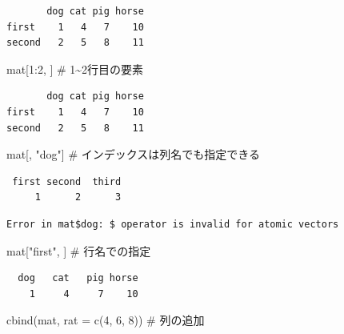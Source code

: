 \documentclass[
  letterpaper,
  DIV=11,
  numbers=noendperiod]{scrreprt}
\newenvironment{Shaded}{\begin{snugshade}}{\end{snugshade}}
\newcommand{\AttributeTok}[1]{\textcolor[rgb]{0.40,0.45,0.13}{#1}}
\newcommand{\CommentTok}[1]{\textcolor[rgb]{0.37,0.37,0.37}{#1}}
\newcommand{\DecValTok}[1]{\textcolor[rgb]{0.68,0.00,0.00}{#1}}
\newcommand{\FunctionTok}[1]{\textcolor[rgb]{0.28,0.35,0.67}{#1}}
\newcommand{\NormalTok}[1]{\textcolor[rgb]{0.00,0.23,0.31}{#1}}
\newcommand{\SpecialCharTok}[1]{\textcolor[rgb]{0.37,0.37,0.37}{#1}}
\newcommand{\StringTok}[1]{\textcolor[rgb]{0.13,0.47,0.30}{#1}}
\begin{document}
\begin{verbatim}
       dog cat pig horse
first    1   4   7    10
second   2   5   8    11
\end{verbatim}

\begin{Shaded}
\begin{Highlighting}[]
\NormalTok{mat[}\DecValTok{1}\SpecialCharTok{:}\DecValTok{2}\NormalTok{, ] }\CommentTok{\# 1\textasciitilde{}2行目の要素}
\end{Highlighting}
\end{Shaded}

\begin{verbatim}
       dog cat pig horse
first    1   4   7    10
second   2   5   8    11
\end{verbatim}

\begin{Shaded}
\begin{Highlighting}[]
\NormalTok{mat[, }\StringTok{"dog"}\NormalTok{] }\CommentTok{\# インデックスは列名でも指定できる}
\end{Highlighting}
\end{Shaded}

\begin{verbatim}
 first second  third 
     1      2      3 
\end{verbatim}

\begin{Shaded}
\end{Shaded}

\begin{verbatim}
Error in mat$dog: $ operator is invalid for atomic vectors
\end{verbatim}

\begin{Shaded}
\begin{Highlighting}[]
\NormalTok{mat[}\StringTok{"first"}\NormalTok{, ] }\CommentTok{\# 行名での指定}
\end{Highlighting}
\end{Shaded}

\begin{verbatim}
  dog   cat   pig horse 
    1     4     7    10 
\end{verbatim}

\begin{Shaded}
\begin{Highlighting}[]
\FunctionTok{cbind}\NormalTok{(mat, }\AttributeTok{rat =} \FunctionTok{c}\NormalTok{(}\DecValTok{4}\NormalTok{, }\DecValTok{6}\NormalTok{, }\DecValTok{8}\NormalTok{)) }\CommentTok{\# 列の追加}
\end{Highlighting}
\end{Shaded}
\end{document}
